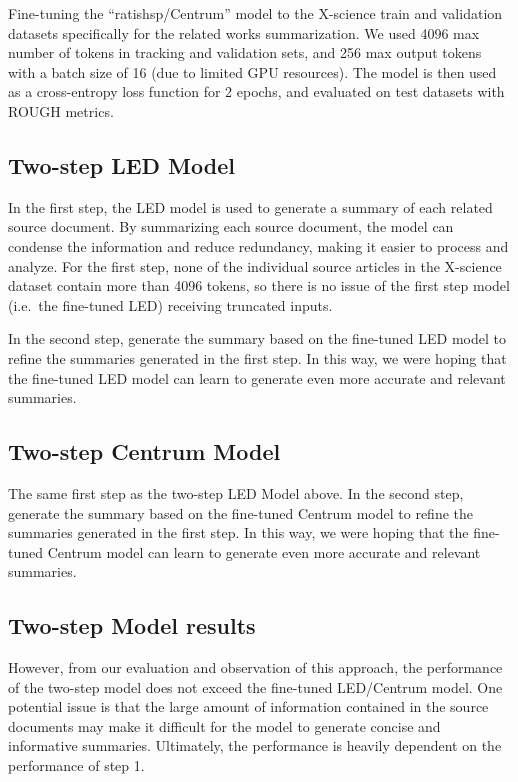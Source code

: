 \documentclass[12pt, twocolumn]{article}
\numberwithin{equation}{section}
\begin{document}
Fine-tuning the ``ratishsp/Centrum'' model to the X-science train and validation datasets specifically for the related works summarization. We used 4096 max number of tokens in tracking and validation sets, and 256 max output tokens with a batch size of 16 (due to limited GPU resources). The model is then used as a cross-entropy loss function for 2 epochs, and evaluated on test datasets with ROUGH metrics. 

\subsection{Two-step LED Model}
\label{app:model-two-step-led}

In the first step, the LED model is used to generate a summary of each related source document. By summarizing each source document, the model can condense the information and reduce redundancy, making it easier to process and analyze. For the first step, none of the individual source articles in the X-science dataset contain more than 4096 tokens, so there is no issue of the first step model (i.e.~the fine-tuned LED) receiving truncated inputs.

In the second step, generate the summary based on the fine-tuned LED model to refine the summaries generated in the first step. In this way, we were hoping that the fine-tuned LED model can learn to generate even more accurate and relevant summaries.

\subsection{Two-step Centrum Model}
\label{app:model-two-step-centrum}

The same first step as the two-step LED Model above. In the second step, generate the summary based on the fine-tuned Centrum model to refine the summaries generated in the first step. In this way, we were hoping that the fine-tuned Centrum model can learn to generate even more accurate and relevant summaries.

\subsection{Two-step Model results}
\label{app:model-two-step-model-results}

However, from our evaluation and observation of this approach, the performance of the two-step model does not exceed the fine-tuned LED/Centrum model. One potential issue is that the large amount of information contained in the source documents may make it difficult for the model to generate concise and informative summaries. Ultimately, the performance is heavily dependent on the performance of step 1. 
\end{document}
